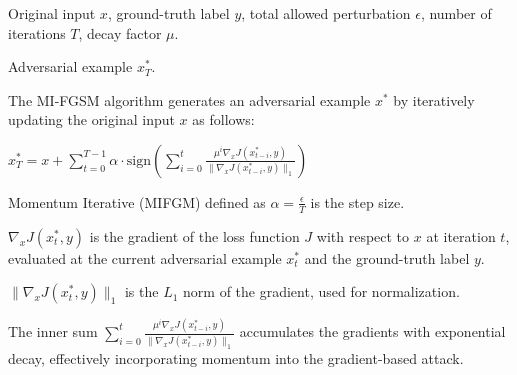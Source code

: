 Original input $x$, ground-truth label $y$, total allowed perturbation $\epsilon$, number of iterations $T$, decay factor $\mu$.

Adversarial example $x^*_T$.

The MI-FGSM algorithm generates an adversarial example $x^*$ by iteratively updating the original input $x$ as follows:

$
x^*_T = x + \sum_{t=0}^{T-1} \alpha \cdot \text{sign} \left( \sum_{i=0}^{t} \frac{\mu^i \nabla_x J(x^*_{t-i}, y)}{\| \nabla_x J(x^*_{t-i}, y) \|_1} \right)
$

Momentum Iterative (MIFGM) defined as $\alpha = \frac{\epsilon}{T}$ is the step size.

$\nabla_x J(x^*_t, y)$ is the gradient of the loss function $J$ with respect to $x$ at iteration $t$, evaluated at the current adversarial example $x^*_t$ and the ground-truth label $y$.

$\| \nabla_x J(x^*_t, y) \|_1$ is the $L_1$ norm of the gradient, used for normalization.

The inner sum $\sum_{i=0}^{t} \frac{\mu^i \nabla_x J(x^*_{t-i}, y)}{\| \nabla_x J(x^*_{t-i}, y) \|_1}$ accumulates the gradients with exponential decay, effectively incorporating momentum into the gradient-based attack.
